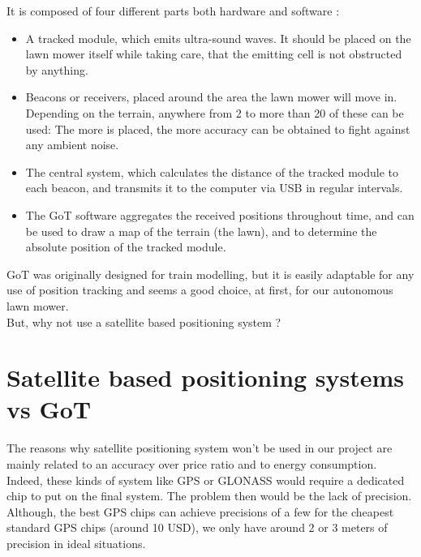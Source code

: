 \noindent
It is composed of four different parts both hardware and software :
\begin{itemize}
	\item A tracked module, which emits ultra-sound waves. It should be placed on the lawn mower itself while taking care, that the emitting cell is not obstructed by anything.
	\item Beacons or receivers, placed around the area the lawn mower will move in. Depending on the terrain, anywhere from 2  to more than 20 of these can be used: The more is placed, the more accuracy can be obtained to fight against any ambient noise.
	\item The central system, which calculates the distance of the tracked module to each beacon, and transmits it to the computer via USB in regular intervals.
	\item The GoT software aggregates the received positions throughout time, and can be used to draw a map of the terrain (the lawn), and to determine the absolute position of the tracked module.
\end{itemize}
GoT was originally designed for train modelling, but it is easily adaptable for any use of position tracking and seems a good choice, at first, for our autonomous lawn mower.\\
But, why not use a satellite based positioning system ?

\section{Satellite based positioning systems vs GoT}
The reasons why satellite positioning system won't be used in our project are mainly related to an accuracy over price ratio and to energy consumption.\\

\noindent
Indeed, these kinds of system like GPS or GLONASS would require a dedicated chip to put on the final system. The problem then would be the lack of precision. Although, the best GPS chips can achieve precisions of a few for the cheapest standard GPS chips (around 10 USD), we only have around 2 or 3 meters of precision in ideal situations.  \\


